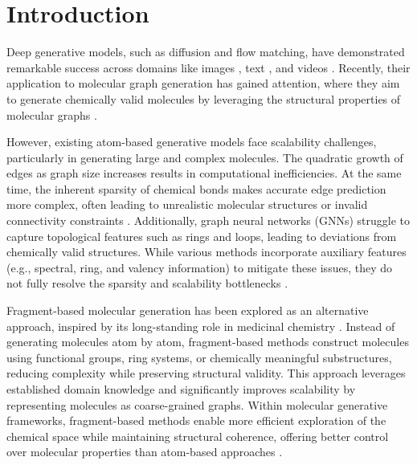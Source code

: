 \section{Introduction}
\label{sec:introduction}

Deep generative models, such as diffusion and flow matching, have demonstrated remarkable success across domains like images \citep{glide_image, ldm, ddpm}, text \citep{diffusion_lm}, and videos \citep{videocontrolnet, vdm}. Recently, their application to molecular graph generation has gained attention, where they aim to generate chemically valid molecules by leveraging the structural properties of molecular graphs \citep{gdss, digress, defog}.

However, existing atom-based generative models face scalability challenges, particularly in generating large and complex molecules. 
The quadratic growth of edges as graph size increases results in computational inefficiencies. 
At the same time, the inherent sparsity of chemical bonds makes accurate edge prediction more complex, often leading to unrealistic molecular structures or invalid connectivity constraints \citep{sparsediff, edge_dgree-guided}.
Additionally, graph neural networks (GNNs) struggle to capture topological features such as rings and loops, leading to deviations from chemically valid structures. While various methods incorporate auxiliary features (e.g., spectral, ring, and valency information) to mitigate these issues, they do not fully resolve the sparsity and scalability bottlenecks \citep{digress}.

Fragment-based molecular generation has been explored as an alternative approach, inspired by its long-standing role in medicinal chemistry \citep{hajduk2007decade, joseph2014fragment, kirsch2019concepts}. Instead of generating molecules atom by atom, fragment-based methods construct molecules using functional groups, ring systems, or chemically meaningful substructures, reducing complexity while preserving structural validity. This approach leverages established domain knowledge and significantly improves scalability by representing molecules as coarse-grained graphs. Within molecular generative frameworks, fragment-based methods enable more efficient exploration of the chemical space while maintaining structural coherence, offering better control over molecular properties than atom-based approaches \citep{jtvae, hierdiff, bbar, magnet}.

